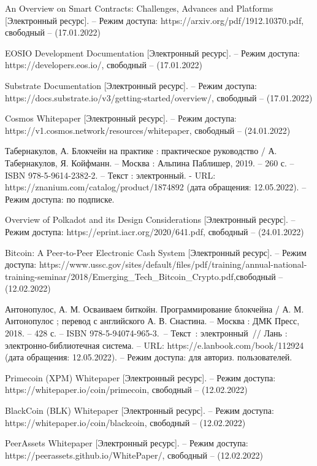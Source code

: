 \begin{thebibliography}{}
	An Overview on Smart Contracts: Challenges, Advances and Platforms [Электронный ресурс]. -- Режим доступа: https://arxiv.org/pdf/1912.10370.pdf, свободный -- (17.01.2022)
	
	EOSIO Development Documentation [Электронный ресурс]. -- Режим доступа: https://developers.eos.io/, свободный -- (17.01.2022)
	
	Substrate Documentation [Электронный ресурс]. -- Режим доступа: https://docs.substrate.io/v3/getting-started/overview/, свободный -- (17.01.2022)
	
	Cosmos Whitepaper [Электронный ресурс]. -- Режим доступа: https://v1.cosmos.network/resources/whitepaper, свободный -- (24.01.2022)
	
	Табернакулов, А. Блокчейн на практике : практическое руководство / А. Табернакулов, Я. Койфманн. -- Москва : Альпина Паблишер, 2019. -- 260 с. -- ISBN 978-5-9614-2382-2. -- Текст : электронный. - URL: https://znanium.com/catalog/product/1874892 (дата обращения: 12.05.2022). – Режим доступа: по подписке.
	
	Overview of Polkadot and its Design Considerations [Электронный ресурс]. -- Режим доступа: https://eprint.iacr.org/2020/641.pdf, свободный -- (24.01.2022)
	
	Bitcoin: A Peer-to-Peer Electronic Cash System [Электронный ресурс]. -- Режим доступа: https://www.ussc.gov/sites/default/files/pdf/training/annual-national-training-seminar/2018/Emerging\_Tech\_Bitcoin\_Crypto.pdf,свободный -- (12.02.2022)
	
	Антонопулос, А. М. Осваиваем биткойн. Программирование блокчейна / А. М. Антонопулос ; перевод с английского А. В. Снастина. -- Москва : ДМК Пресс, 2018. -- 428 с. -- ISBN 978-5-94074-965-3. -- Текст : электронный // Лань : электронно-библиотечная система. -- URL: https://e.lanbook.com/book/112924 (дата обращения: 12.05.2022). -- Режим доступа: для авториз. пользователей.
	
	Primecoin (XPM) Whitepaper [Электронный ресурс]. -- Режим доступа: https://whitepaper.io/coin/primecoin, свободный -- (12.02.2022)
	
	BlackCoin (BLK) Whitepaper [Электронный ресурс]. -- Режим доступа: https://whitepaper.io/coin/blackcoin, свободный -- (12.02.2022)
	
	PeerAssets Whitepaper [Электронный ресурс]. -- Режим доступа: https://peerassets.github.io/WhitePaper/, свободный -- (12.02.2022)
	

\end{thebibliography}
